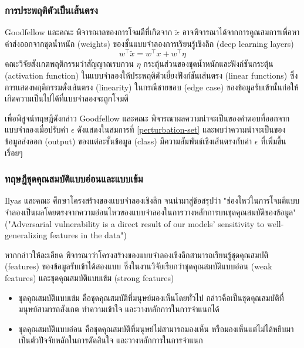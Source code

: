 \documentclass{cpepaper}
\begin{document}
\subsubsection{การประพฤติตัวเป็นเส้นตรง}
Goodfellow และคณะ พิจารณาลของการโจมตีที่เกิดจาก $\tilde{x}$ อาจพิจารณาได้จากการคูณสมการเพื่อหาค่าส่งออกจากชุดน้ำหนัก (weights) ของชั้นแบบจำลองการเรียนรู้เชิงลึก (deep learning layers) 
\begin{equation}
    w^\top\tilde{x} = w^\top x + w^\top \eta
\end{equation}
คณะวิจัยสังเกตพฤติกรรมว่าสัญญาณรบกวน $\eta$ กระตุ้นส่วนของชุดน้ำหนักและฟังก์ชันกระตุ้น (activation function) ในแบบจำลองให้ประพฤติตัวเยี่ยงฟังก์ชันเส้นตรง (linear functions) ซึ่งการแสดงพฤติกรรมดั่งเส้นตรง (linearity) ในกรณีชายขอบ (edge case) ของข้อมูลรับเข้านั้นก่อให้เกิดความเป็นไปได้ที่แบบจำลองจะถูกโจมตี

เพื่อพิสูจน์ทฤษฎีดังกล่าว Goodfellow และคณะ พิจารณาผลความน่าจะเป็นของคำตอบที่ออกจากแบบจำลองเมื่อปรับค่า $\epsilon$ ดังแสดงในสมการที่ \ref{perturbation-set} และพบว่าความน่าจะเป็นของข้อมูลส่งออก (output) ของแต่ละชั้นข้อมูล (class) มีความสัมพันธ์เชิงเส้นตรงกับค่า $\epsilon$ ที่เพิ่มขึ้นเรื่อยๆ

\subsubsection{ทฤษฎีชุดคุณสมบัติแบบอ่อนและแบบเข้ม}

Ilyas และคณะ ศึกษาโครงสร้างของแบบจำลองเชิงลึก จนนำมาสู่ข้อสรุปว่า "ช่องโหว่ในการโจมตีแบบจำลองเป็นผลโดยตรงจากความอ่อนไหวของแบบจำลองในการวางหลักการบนชุดคุณสมบัติของข้อมูล" ("Adversarial vulnerability is a direct result of our models’ sensitivity to well-generalizing features in the data")

หากกล่าวให้ละเอียด พิจารณาว่าโครงสร้างของแบบจำลองเชิงลึกสามารถเรียนรู้ชุดคุณสมบัติ (features) ของข้อมูลรับเข้าได้สองแบบ ซึ่งในงานวิจัยเรียกว่าชุดคุณสมบัติแบบอ่อน (weak features) และชุดคุณสมบัติแบบเข้ม (strong features)
\begin{itemize}
    \item ชุดคุณสมบัติแบบเข้ม คือชุดคุณสมบัติที่มนุษย์มองเห็นโดยทั่วไป กล่าวคือเป็นชุดคุณสมบัติที่มนุษย์สามารถสังเกต ทำความเข้าใจ และวางหลักการในการจำแนกได้
    \item ชุดคุณสมบัติแบบอ่อน คือชุดคุณสมบัติที่มนุษย์ไม่สามารถมองเห็น หรือมองเห็นแต่ไม่ได้หยิบมาเป็นตัวปัจจัยหลักในการตัดสินใจ และวางหลักการในการจำแนก
\end{itemize}
\end{document}
